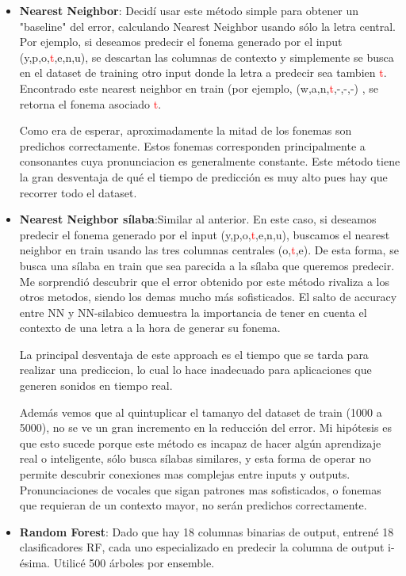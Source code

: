 \documentclass[paper=a4, fontsize=11pt]{scrartcl} %
\numberwithin{equation}{section} %
\numberwithin{figure}{section} %
\numberwithin{table}{section} %
\begin{document}
\begin{itemize}
\item \textbf{Nearest Neighbor}: Decidí usar este método simple para obtener un "baseline" del error, calculando Nearest Neighbor usando sólo la letra central. Por ejemplo, si deseamos predecir el fonema generado por el input (y,p,o,\textcolor{red}{t},e,n,u), se descartan las columnas de contexto y simplemente se busca en el dataset de training otro input donde la letra a predecir sea tambien \textcolor{red}{t}. Encontrado este nearest neighbor en train (por ejemplo, (w,a,n,\textcolor{red}{t},-,-,-) , se retorna el fonema asociado \textcolor{red}{t}.

Como era de esperar, aproximadamente la mitad de los fonemas son predichos correctamente. Estos fonemas corresponden principalmente a consonantes cuya pronunciacion es generalmente constante. Este método tiene la gran desventaja de qué el tiempo de predicción es muy alto pues hay que recorrer todo el dataset.

\item \textbf{Nearest Neighbor sílaba}:Similar al anterior. En este caso, si deseamos predecir el fonema generado por el input (y,p,o,\textcolor{red}{t},e,n,u), buscamos el nearest neighbor en train usando las tres columnas centrales (o,\textcolor{red}{t},e). De esta forma, se busca una sílaba en train que sea parecida a la sílaba que queremos predecir. Me sorprendió descubrir que el error obtenido por este método rivaliza a los otros metodos, siendo los demas mucho más sofisticados. El salto de accuracy entre NN y NN-silabico demuestra la importancia de tener en cuenta el contexto de una letra a la hora de generar su fonema.

La principal desventaja de este approach es el tiempo que se tarda para realizar una prediccion, lo cual lo hace inadecuado para aplicaciones que generen sonidos en tiempo real.

Además vemos que al quintuplicar el tamanyo del dataset de train (1000 a 5000), no se ve un gran incremento en la reducción del error. Mi hipótesis es que esto sucede porque este método es incapaz de hacer algún aprendizaje real o inteligente, sólo busca sílabas similares, y esta forma de operar no permite descubrir conexiones mas complejas entre inputs y outputs. Pronunciaciones de vocales que sigan patrones mas sofisticados, o fonemas que requieran de un contexto mayor, no serán predichos correctamente.

\item \textbf{Random Forest}: Dado que hay 18 columnas binarias de output, entrené 18 clasificadores RF, cada uno especializado en predecir la columna de output i-ésima. Utilicé 500 árboles por ensemble.


\end{itemize}
\end{document}

